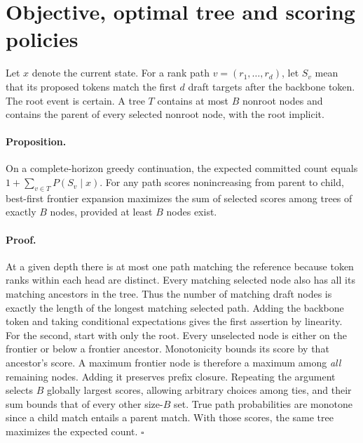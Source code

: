 \documentclass{article}
\begin{document}
\section{Objective, optimal tree and scoring policies}
Let $x$ denote the current state. For a rank path $v=(r_1,\ldots,r_d)$, let $S_v$ mean that its proposed tokens match the first $d$ draft targets after the backbone token. The root event is certain. A tree $T$ contains at most $B$ nonroot nodes and contains the parent of every selected nonroot node, with the root implicit.
\paragraph{Proposition.} On a complete-horizon greedy continuation, the expected committed count equals $1+\sum_{v\in T}P(S_v\mid x)$. For any path scores nonincreasing from parent to child, best-first frontier expansion maximizes the sum of selected scores among trees of exactly $B$ nodes, provided at least $B$ nodes exist.
\paragraph{Proof.} At a given depth there is at most one path matching the reference because token ranks within each head are distinct. Every matching selected node also has all its matching ancestors in the tree. Thus the number of matching draft nodes is exactly the length of the longest matching selected path. Adding the backbone token and taking conditional expectations gives the first assertion by linearity. For the second, start with only the root. Every unselected node is either on the frontier or below a frontier ancestor. Monotonicity bounds its score by that ancestor's score. A maximum frontier node is therefore a maximum among \emph{all} remaining nodes. Adding it preserves prefix closure. Repeating the argument selects $B$ globally largest scores, allowing arbitrary choices among ties, and their sum bounds that of every other size-$B$ set. True path probabilities are monotone since a child match entails a parent match. With those scores, the same tree maximizes the expected count. \hfill$\square$
\end{document}
